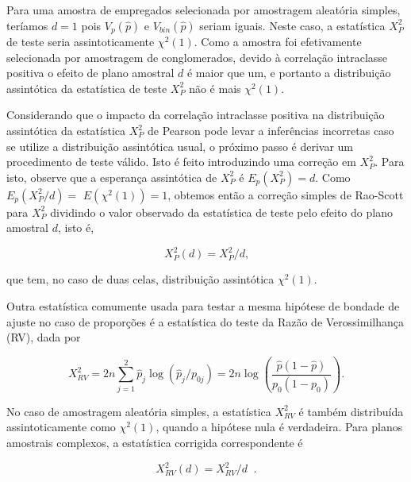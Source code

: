 \documentclass[]{book}
\numberwithin{example}{chapter}
\numberwithin{remark}{chapter}
\numberwithin{definition}{chapter}
\begin{document}
Para uma amostra de empregados selecionada por amostragem aleatória
simples, teríamos \(d=1\) pois \(V_{p}\left( \widehat{p}\right)\) e
\(V_{bin}\left( \widehat{p}\right)\) seriam iguais. Neste caso, a
estatística \(X_{P}^{2}\) de teste seria assintoticamente
\(\chi ^{2}\left(1\right)\). Como a amostra foi efetivamente selecionada
por amostragem de conglomerados, devido à correlação intraclasse
positiva o efeito de plano amostral \(d\) é maior que um, e portanto a
distribuição assintótica da estatística de teste \(X_{P}^{2}\) não é
mais \(\chi ^{2}\left( 1\right)\).

Considerando que o impacto da correlação intraclasse positiva na
distribuição assintótica da estatística \(X_{P}^{2}\) de Pearson pode
levar a inferências incorretas caso se utilize a distribuição
assintótica usual, o próximo passo é derivar um procedimento de teste
válido. Isto é feito introduzindo uma correção em \(X_{P}^{2}.\) Para
isto, observe que a esperança assintótica de \(X_{P}^{2}\) é
\(E_{p}\left( X_{P}^{2}\right) =d\). Como
\(E_{p}\left( X_{P}^{2}/d\right) =\)
\(E\left( \chi ^{2}\left( 1\right) \right)=1\), obtemos então a correção
simples de Rao-Scott para \(X_{P}^{2}\) dividindo o valor observado da
estatística de teste pelo efeito do plano amostral \(d\), isto é,

\begin{equation}
X_{P}^{2}(d)=X_{P}^{2}/d\mbox{,}  
\label{eq:qual3}
\end{equation}

que tem, no caso de duas celas, distribuição assintótica
\(\chi^{2}\left( 1\right)\).

Outra estatística comumente usada para testar a mesma hipótese de
bondade de ajuste no caso de proporções é a estatística do teste da
Razão de Verossimilhança (RV), dada por

\begin{equation}
X_{RV}^{2}=2n\sum\limits_{j=1}^{2}\widehat{p}_{j}\log \left( 
\widehat{p}_{j}/p_{0j}\right) =2n\log \left( \frac{\widehat{p}\left( 1-
\widehat{p}\right) }{p_{0}\left( 1-p_{0}\right) }\right) .
\label{eq:qual4}
\end{equation}

No caso de amostragem aleatória simples, a estatística \(X_{RV}^{2}\) é
também distribuída assintoticamente como \(\chi ^{2}\left(1\right)\),
quando a hipótese nula é verdadeira. Para planos amostrais complexos, a
estatística corrigida correspondente é

\begin{equation}
X_{RV}^{2}(d)=X_{RV}^{2}/d\;\;.  
\label{eq:qual5}
\end{equation}
\end{document}
